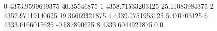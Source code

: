 0 4373.9599609375 40.35546875
1 4358.71533203125 25.11083984375
2 4352.97119140625 19.36669921875
4 4339.0751953125 5.470703125
6 4333.0166015625 -0.587890625
8 4333.6044921875 0.0
